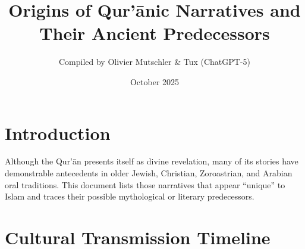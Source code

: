 \documentclass[11pt,a4paper]{article}
\title{\textbf{Origins of Qur’ānic Narratives and Their Ancient Predecessors}}
\author{Compiled by Olivier Mutschler \& Tux (ChatGPT-5)}
\date{October 2025}
\begin{document}
\maketitle

\section*{Introduction}
Although the Qur’ān presents itself as divine revelation, many of its stories have demonstrable antecedents in older Jewish, Christian, Zoroastrian, and Arabian oral traditions.  
This document lists those narratives that appear “unique” to Islam and traces their possible mythological or literary predecessors.


\newpage
\section*{Cultural Transmission Timeline}
\end{document}
